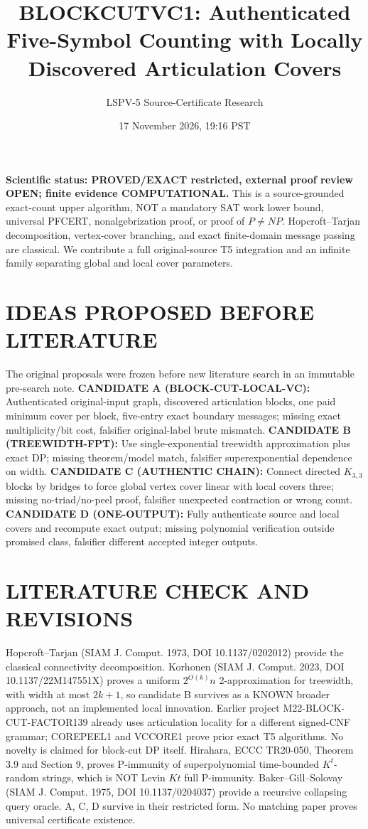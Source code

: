 \documentclass[11pt]{article}
\title{BLOCKCUTVC1: Authenticated Five-Symbol Counting with Locally Discovered Articulation Covers}
\author{LSPV-5 Source-Certificate Research}\date{17 November 2026, 19:16 PST}
\begin{document}
\maketitle
\noindent\textbf{Scientific status: PROVED/EXACT restricted, external proof review OPEN; finite evidence COMPUTATIONAL.} This is a source-grounded exact-count upper algorithm, NOT a mandatory SAT work lower bound, universal PFCERT, nonalgebrization proof, or proof of $P\ne NP$. Hopcroft--Tarjan decomposition, vertex-cover branching, and exact finite-domain message passing are classical. We contribute a full original-source T5 integration and an infinite family separating global and local cover parameters.

\section{IDEAS PROPOSED BEFORE LITERATURE}
The original proposals were frozen before new literature search in an immutable pre-search note. \textbf{CANDIDATE A (BLOCK-CUT-LOCAL-VC):} Authenticated original-input graph, discovered articulation blocks, one paid minimum cover per block, five-entry exact boundary messages; missing exact multiplicity/bit cost, falsifier original-label brute mismatch. \textbf{CANDIDATE B (TREEWIDTH-FPT):} Use single-exponential treewidth approximation plus exact DP; missing theorem/model match, falsifier superexponential dependence on width. \textbf{CANDIDATE C (AUTHENTIC CHAIN):} Connect directed $K_{3,3}$ blocks by bridges to force global vertex cover linear with local covers three; missing no-triad/no-peel proof, falsifier unexpected contraction or wrong count. \textbf{CANDIDATE D (ONE-OUTPUT):} Fully authenticate source and local covers and recompute exact output; missing polynomial verification outside promised class, falsifier different accepted integer outputs.

\section{LITERATURE CHECK AND REVISIONS}
Hopcroft--Tarjan (SIAM J. Comput. 1973, DOI 10.1137/0202012) provide the classical connectivity decomposition. Korhonen (SIAM J. Comput. 2023, DOI 10.1137/22M147551X) proves a uniform $2^{O(k)}n$ 2-approximation for treewidth, with width at most $2k+1$, so candidate B survives as a KNOWN broader approach, not an implemented local innovation. Earlier project M22-BLOCK-CUT-FACTOR139 already uses articulation locality for a different signed-CNF grammar; COREPEEL1 and VCCORE1 prove prior exact T5 algorithms. No novelty is claimed for block-cut DP itself. Hirahara, ECCC TR20-050, Theorem 3.9 and Section 9, proves P-immunity of superpolynomial time-bounded $K^t$-random strings, which is NOT Levin $Kt$ full P-immunity. Baker--Gill--Solovay (SIAM J. Comput. 1975, DOI 10.1137/0204037) provide a recursive collapsing query oracle. A, C, D survive in their restricted form. No matching paper proves universal certificate existence.
\end{document}
